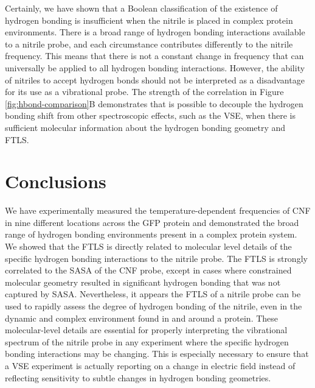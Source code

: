 Certainly, we have shown that a Boolean classification of the existence of hydrogen bonding is insufficient when the nitrile is placed in complex protein environments.
There is a broad range of hydrogen bonding interactions available to a nitrile probe, and each circumstance contributes differently to the nitrile frequency.
This means that there is not a constant change in frequency that can universally be applied to all hydrogen bonding interactions.
However, the ability of nitriles to accept hydrogen bonds should not be interpreted as a disadvantage for its use as a vibrational probe.
The strength of the correlation in Figure \ref{fig:hbond-comparison}B demonstrates that is possible to decouple the hydrogen bonding shift from other spectroscopic effects, such as the VSE, when there is sufficient molecular information about the hydrogen bonding geometry and FTLS.

\section{Conclusions}

We have experimentally measured the temperature-dependent frequencies of CNF in nine different locations across the GFP protein and demonstrated the broad range of hydrogen bonding environments present in a complex protein system.
We showed that the FTLS is directly related to molecular level details of the specific hydrogen bonding interactions to the nitrile probe.
The FTLS is strongly correlated to the SASA of the CNF probe, except in cases where constrained molecular geometry resulted in significant hydrogen bonding that was not captured by SASA.
Nevertheless, it appears the FTLS of a nitrile probe can be used to rapidly assess the degree of hydrogen bonding of the nitrile, even in the dynamic and complex environment found in and around a protein.
These molecular-level details are essential for properly interpreting the vibrational spectrum of the nitrile probe in any experiment where the specific hydrogen bonding interactions may be changing.
This is especially necessary to ensure that a VSE experiment is actually reporting on a change in electric field instead of reflecting sensitivity to subtle changes in hydrogen bonding geometries. 

